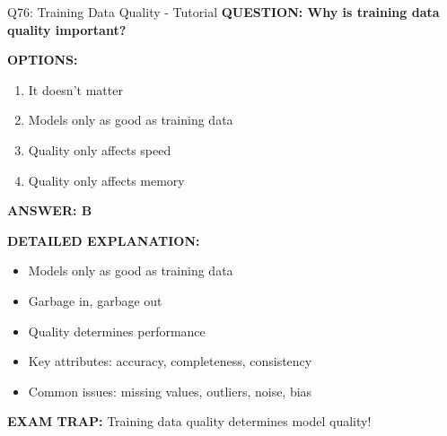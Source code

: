 \documentclass[8pt]{beamer}
\begin{document}
	\begin{frame}{Q76: Training Data Quality - Tutorial}
		\fontsize{6.5}{7.5}\selectfont
		\textbf{QUESTION: Why is training data quality important?}
		
		\vspace{0.1cm}
		\textbf{OPTIONS:}
		\begin{enumerate}
			\item It doesn't matter
			\item Models only as good as training data
			\item Quality only affects speed
			\item Quality only affects memory
		\end{enumerate}
		
		\vspace{0.1cm}
		\textcolor{myblue}{\textbf{ANSWER: B}}
		
		\vspace{0.1cm}
		\textbf{DETAILED EXPLANATION:}
		\begin{itemize}
			\item Models only as good as training data
			\item Garbage in, garbage out
			\item Quality determines performance
			\item Key attributes: accuracy, completeness, consistency
			\item Common issues: missing values, outliers, noise, bias
		\end{itemize}
		
		\vspace{0.1cm}
		\textcolor{myred}{\textbf{EXAM TRAP:}} Training data quality \textcolor{myblue}{determines model quality}!
	\end{frame}
	
\end{document}
